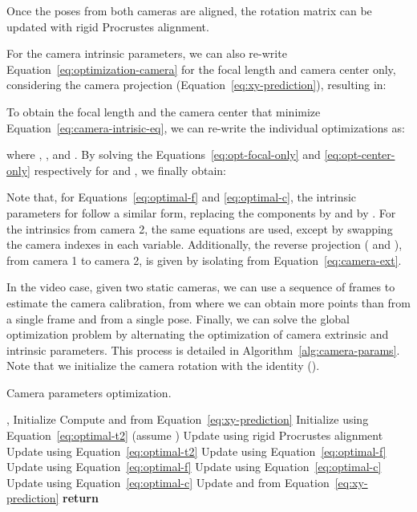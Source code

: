 \documentclass[10pt,twocolumn,letterpaper]{article}
\newcommand{\revb}[1]{{#1}}
\begin{document}
Once the poses from both cameras are aligned, the rotation matrix  can be
updated with rigid Procrustes alignment.

For the camera intrinsic parameters, we can also re-write
Equation~\ref{eq:optimization-camera} for the
focal length and camera center only, considering the camera projection
(Equation~\ref{eq:xy-prediction}), resulting in:

To obtain the focal length and the camera center that minimize Equation~\ref{eq:camera-intrisic-eq},
we can re-write the individual optimizations as:


where ,
, and
.
By solving the Equations~\ref{eq:opt-focal-only} and \ref{eq:opt-center-only}
respectively for  and , we finally obtain:


Note that, for Equations~\ref{eq:optimal-f} and \ref{eq:optimal-c},
the intrinsic parameters for  follow a similar form, replacing
the  components by  and  by .
For the intrinsics from camera 2, the same equations are used,
except by swapping the camera indexes in each variable.
Additionally, the reverse projection
( and ), from camera 1 to camera 2, is given by
isolating  from Equation~\ref{eq:camera-ext}.

In the video case, given two static cameras, we can use a sequence of frames
to estimate the camera calibration, from where we can obtain more points than
from a single frame and from a single pose.
Finally, we can solve the global optimization problem by alternating
the optimization of camera extrinsic and intrinsic parameters.
This process is detailed in Algorithm~\ref{alg:camera-params}.
\revb{Note that we initialize the camera rotation  with the identity ()}.

\begin{algorithm}[!htb]
  \caption{Camera parameters optimization.}
  \label{alg:camera-params}
  \begin{algorithmic}[1]
    \Require , 
    \State Initialize 
    \State Compute  and  from Equation~\ref{eq:xy-prediction}
    \State Initialize  using Equation~\ref{eq:optimal-t2} (assume )
    \State 
    \Repeat
      \State Update  using rigid Procrustes alignment
      \State Update  using Equation~\ref{eq:optimal-t2}
      \If {}
        \State Update  using Equation~\ref{eq:optimal-f}
      \ElsIf {}
        \State Update  using Equation~\ref{eq:optimal-f}
      \ElsIf {}
        \State Update  using Equation~\ref{eq:optimal-c}
      \ElsIf {}
        \State Update  using Equation~\ref{eq:optimal-c}
      \EndIf
      \State Update  and  from Equation~\ref{eq:xy-prediction}
      \State 
    \Until {}
    \State \textbf{return} 
  \end{algorithmic}
\end{algorithm}
\end{document}
